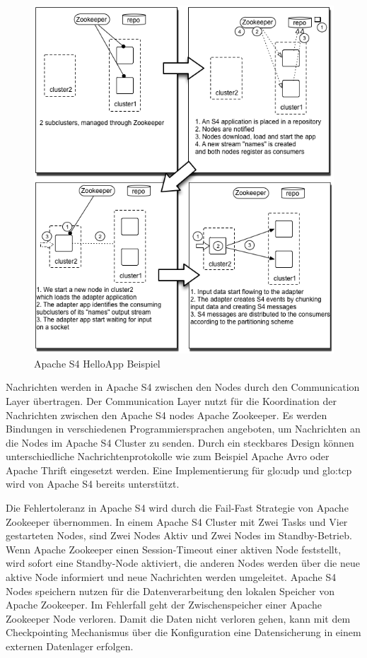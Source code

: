 \begin{figure}[htb!]
\centering
\includegraphics[width=1.0\textwidth]{bilder/s4SampleAppDeployment.png}
\caption{Apache S4 HelloApp Beispiel
\label{fig:s4HelloApp}}
\end{figure}

Nachrichten werden in Apache S4 zwischen den Nodes durch den Communication Layer übertragen. Der Communication Layer nutzt für die Koordination der Nachrichten zwischen den Apache S4 nodes Apache Zookeeper. Es werden Bindungen in verschiedenen Programmiersprachen angeboten, um Nachrichten an die Nodes im Apache S4 Cluster zu senden. Durch ein steckbares Design können unterschiedliche Nachrichtenprotokolle wie zum Beispiel Apache Avro oder Apache Thrift eingesetzt werden. Eine Implementierung für \gls{glo:udp}  und \gls{glo:tcp}  wird von Apache S4 bereits unterstützt. 

Die Fehlertoleranz in Apache S4 wird durch die Fail-Fast Strategie von Apache Zookeeper übernommen. In einem Apache S4 Cluster mit Zwei Tasks und Vier gestarteten Nodes, sind Zwei Nodes Aktiv und Zwei Nodes im Standby-Betrieb. Wenn Apache Zookeeper einen Session-Timeout einer aktiven Node feststellt, wird sofort eine Standby-Node aktiviert, die anderen Nodes werden über die neue aktive Node informiert und neue Nachrichten werden umgeleitet. Apache S4 Nodes speichern nutzen für die Datenverarbeitung den lokalen Speicher von Apache Zookeeper. Im Fehlerfall geht der Zwischenspeicher einer Apache Zookeeper Node verloren. Damit die Daten nicht verloren gehen, kann mit dem Checkpointing Mechanismus über die Konfiguration eine Datensicherung in einem externen Datenlager erfolgen. 

